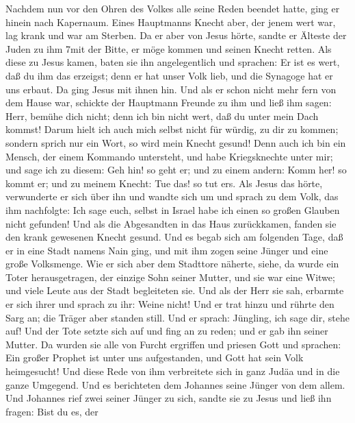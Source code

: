  Nachdem nun vor den Ohren des Volkes alle seine Reden
beendet hatte, ging er hinein nach Kapernaum.  Eines
Hauptmanns Knecht aber, der jenem wert war, lag krank und war am
Sterben.  Da er aber von Jesus hörte, sandte er Älteste
der Juden zu ihm 7mit der Bitte, er möge kommen und seinen Knecht
retten.  Als diese zu Jesus kamen, baten sie ihn
angelegentlich und sprachen: Er ist es wert, daß du ihm das erzeigst;
 denn er hat unser Volk lieb, und die Synagoge hat er uns
erbaut.  Da ging Jesus mit ihnen hin. Und als er schon
nicht mehr fern von dem Hause war, schickte der Hauptmann Freunde zu ihm
und ließ ihm sagen: Herr, bemühe dich nicht; denn ich bin nicht wert,
daß du unter mein Dach kommst!  Darum hielt ich auch mich
selbst nicht für würdig, zu dir zu kommen; sondern sprich nur ein Wort,
so wird mein Knecht gesund!  Denn auch ich bin ein Mensch,
der einem Kommando untersteht, und habe Kriegsknechte unter mir; und
sage ich zu diesem: Geh hin! so geht er; und zu einem andern: Komm her!
so kommt er; und zu meinem Knecht: Tue das! so tut er\textquotesingle s.
 Als Jesus das hörte, verwunderte er sich über ihn und
wandte sich um und sprach zu dem Volk, das ihm nachfolgte: Ich sage
euch, selbst in Israel habe ich einen so großen Glauben nicht gefunden!
 Und als die Abgesandten in das Haus zurückkamen, fanden
sie den krank gewesenen Knecht gesund.  Und es begab sich
am folgenden Tage, daß er in eine Stadt namens Nain ging, und mit ihm
zogen seine Jünger und eine große Volksmenge.  Wie er
sich aber dem Stadttore näherte, siehe, da wurde ein Toter
herausgetragen, der einzige Sohn seiner Mutter, und sie war eine Witwe;
und viele Leute aus der Stadt begleiteten sie.  Und als
der Herr sie sah, erbarmte er sich ihrer und sprach zu ihr: Weine nicht!
 Und er trat hinzu und rührte den Sarg an; die Träger
aber standen still. Und er sprach: Jüngling, ich sage dir, stehe auf!
 Und der Tote setzte sich auf und fing an zu reden; und
er gab ihn seiner Mutter.  Da wurden sie alle von Furcht
ergriffen und priesen Gott und sprachen: Ein großer Prophet ist unter
uns aufgestanden, und Gott hat sein Volk heimgesucht! 
Und diese Rede von ihm verbreitete sich in ganz Judäa und in die ganze
Umgegend.  Und es berichteten dem Johannes seine Jünger
von dem allem. Und Johannes rief zwei seiner Jünger zu sich,
 sandte sie zu Jesus und ließ ihn fragen: Bist du es, der
